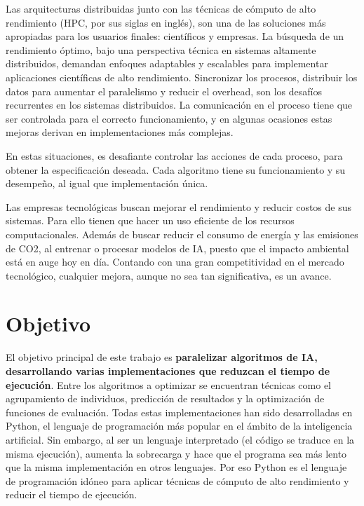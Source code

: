 	Las arquitecturas distribuidas junto con las técnicas de cómputo de alto rendimiento (HPC, por sus siglas en inglés), son una de las soluciones más apropiadas para los usuarios finales: científicos y empresas. La búsqueda de un rendimiento óptimo, bajo una perspectiva técnica en sistemas altamente distribuidos, demandan enfoques adaptables y escalables para implementar aplicaciones científicas de alto rendimiento. Sincronizar los procesos, distribuir los datos para aumentar el paralelismo y reducir el overhead, son los desafíos recurrentes en los sistemas distribuidos. La comunicación en el proceso tiene que ser controlada para el correcto funcionamiento, y en algunas ocasiones estas mejoras derivan en implementaciones más complejas.
	
	En estas situaciones, es desafiante controlar las acciones de cada proceso, para obtener la especificación deseada. Cada algoritmo tiene su funcionamiento y su desempeño, al igual que implementación única.
	
	Las empresas tecnológicas buscan mejorar el rendimiento y reducir costos de sus sistemas. Para ello tienen que hacer un uso eficiente de los recursos computacionales. Además de buscar reducir el consumo de energía y las emisiones de CO2, al entrenar o procesar modelos de IA, puesto que el impacto ambiental está en auge hoy en día.  Contando con una gran competitividad en el mercado tecnológico, cualquier mejora, aunque no sea tan significativa, es un avance.

	\newpage


\section{Objetivo}

	El objetivo principal de este trabajo es \textbf{paralelizar algoritmos de IA, desarrollando varias implementaciones que reduzcan el tiempo de ejecución}. Entre los algoritmos a optimizar se encuentran técnicas como el agrupamiento de individuos, predicción de resultados y la optimización de funciones de evaluación. Todas estas implementaciones han sido desarrolladas en Python, el lenguaje de programación más popular en el ámbito de la inteligencia artificial\cite{sainin2021best}. Sin embargo, al ser un lenguaje interpretado (el código se traduce en la misma ejecución), aumenta la sobrecarga y hace que el programa sea más lento que la misma implementación en otros lenguajes. Por eso Python es el lenguaje de programación idóneo para aplicar técnicas de cómputo de alto rendimiento y reducir el tiempo de ejecución.
	

